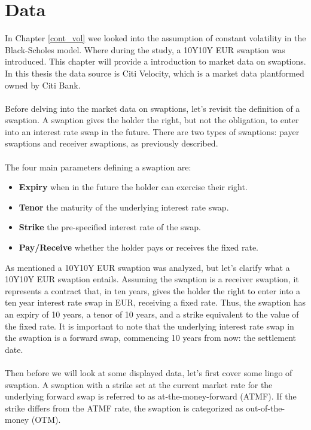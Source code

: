 \section{Data} \label{data_lab}
In Chapter \ref{cont_vol} wee looked into the assumption of constant volatility in the Black-Scholes model. 
Where during the study, a 10Y10Y EUR swaption was introduced. This chapter will provide a introduction to 
market data on swaptions. In this thesis the data source is Citi Velocity, which is a market data plantformed
owned by Citi Bank.
\\\\
Before delving into the market data on swaptions, let's revisit the definition of a swaption. 
A swaption gives the holder the right, but not the obligation, to enter into an interest rate swap in the future. 
There are two types of swaptions: payer swaptions and receiver swaptions, as previously described.
\\\\
The four main parameters defining a swaption are:
\begin{itemize}
\item \textbf{Expiry} \text{---}  when in the future the holder can exercise their right.
\item \textbf{Tenor} \text{---}  the maturity of the underlying interest rate swap.
\item \textbf{Strike} \text{---}  the pre-specified interest rate of the swap.
\item \textbf{Pay/Receive} \text{---}  whether the holder pays or receives the fixed rate.
\end{itemize}
\noindent
As mentioned a 10Y10Y EUR swaption was analyzed, but let's clarify what a 10Y10Y EUR swaption entails. 
Assuming the swaption is a receiver swaption, it represents a contract that, in ten years, 
gives the holder the right to enter into a ten year interest rate swap in EUR, receiving a fixed rate. 
Thus, the swaption has an expiry of 10 years, a tenor of 10 years, and a strike equivalent to the value of the fixed rate. 
It is important to note that the underlying interest rate swap in the swaption is a forward swap, commencing 10 years from now: 
the settlement date.
\\\\
Then before we will look at some displayed data, let's first cover some lingo of swaption. 
A swaption with a strike set at the current market rate for the underlying forward swap is referred 
to as at-the-money-forward (ATMF). If the strike differs from the ATMF rate, the swaption is categorized as out-of-the-money (OTM).
